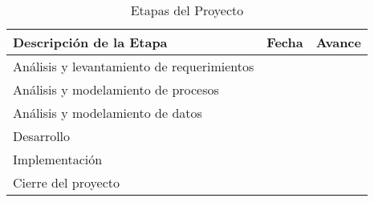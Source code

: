 \begin{table}[H]
\centering
\begin{tabular}{@{}lll@{}}
\toprule
\textbf{Descripción de la Etapa}           & \textbf{Fecha}  & \textbf{Avance} \\ \midrule
Análisis y levantamiento de requerimientos &       &        \\
Análisis y modelamiento de procesos        &       &        \\
Análisis y modelamiento de datos           &       &        \\
Desarrollo                                 &       &        \\
Implementación                             &       &        \\
Cierre del proyecto                        &       &        \\ \bottomrule
\end{tabular}
\caption{Etapas del Proyecto}
\label{tab:my-table}
\end{table}

